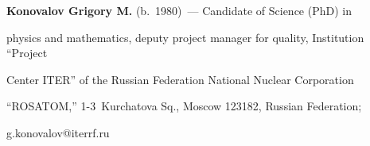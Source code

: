 \vspace*{-14pt} 





\Contrl





\vspace*{-3pt}





\noindent


\textbf{Konovalov Grigory M.} (b.\ 1980)~--- Candidate of Science (PhD) in 


physics and mathematics, deputy project manager for quality, Institution ``Project 


Center ITER'' of the Russian Federation National Nuclear Corporation 


``ROSATOM,'' 1-3~Kurchatova Sq., Moscow 123182, Russian Federation; 


\mbox{g.konovalov@iterrf.ru}





\label{end\stat}





\renewcommand{\bibname}{\protect\rm Литература}    



